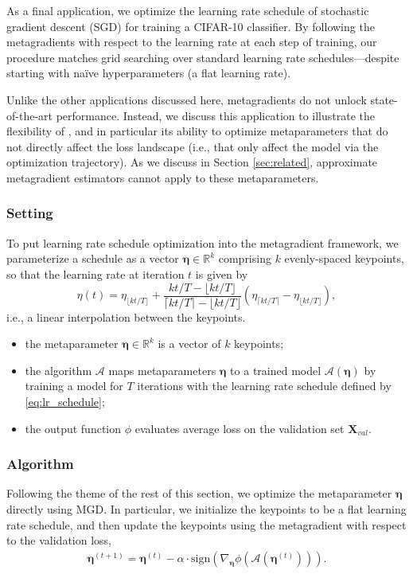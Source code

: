 As a final application, we optimize the learning rate schedule
of stochastic gradient descent (SGD) for training a CIFAR-10 classifier.
By following the metagradients with respect to the learning rate
at each step of training, our procedure matches grid searching
over standard learning rate schedules---despite starting with na\"ive
hyperparameters (a flat learning rate).

Unlike the other applications discussed here,
metagradients do not unlock state-of-the-art performance.
Instead, we discuss this application to illustrate the flexibility
of \replay{}, and in particular its ability to optimize metaparameters
that do not directly affect the loss landscape (i.e., that only affect
the model via the optimization trajectory).
As we discuss in Section \ref{sec:related},
approximate metagradient estimators cannot apply to these metaparameters.

\subsubsection{Setting}
To put learning rate schedule optimization into the metagradient framework,
we parameterize a schedule as a vector $\bm{\eta} \in \mathbb{R}^k$
comprising $k$ evenly-spaced keypoints,
so that the learning rate at iteration $t$ is given by
\begin{equation}
  \label{eq:lr_schedule}
  \eta(t) = \eta_{\lfloor kt/T \rfloor} + \frac{kt/T - \lfloor kt/T
  \rfloor}{\lceil kt/T \rceil - \lfloor kt/T \rfloor} (\eta_{\lceil
  kt/T \rceil} - \eta_{\lfloor kt/T \rfloor}),
\end{equation}
i.e., a linear interpolation between the keypoints.
\begin{itemize}
  \item[(a)] the metaparameter $\bm{\eta} \in \mathbb{R}^k$ is a
    vector of $k$ keypoints;
  \item[(b)] the algorithm $\mathcal{A}$ maps metaparameters
    $\bm{\eta}$ to a trained model $\mathcal{A}(\bm{\eta})$ by
    training a model for $T$ iterations with the learning rate schedule
    defined by \eqref{eq:lr_schedule};
  \item[(c)] the output function $\phi$ evaluates average loss on the
    validation set $\mathbf{X}_{val}$.
\end{itemize}

\subsubsection{Algorithm}
Following the theme of the rest of this section, we optimize the
metaparameter $\bm{\eta}$
directly using MGD. In particular, we initialize the keypoints to be
a flat learning rate schedule,
and then update the keypoints using the metagradient with respect to
the validation loss,
\begin{align*}
  \bm{\eta}^{(t+1)} = \bm{\eta}^{(t)} - \alpha \cdot
  \mathrm{sign}\left(\nabla_{\bm{\eta}}
  \phi(\mathcal{A}(\bm{\eta}^{(t)}))\right).
\end{align*}


